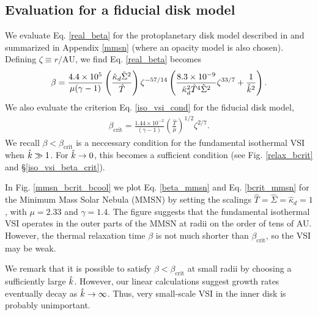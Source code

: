 \subsection{Evaluation for a fiducial disk model}
We evaluate Eq. \ref{real_beta} for the protoplanetary disk model
described in \cite{chiang10} and summarized in Appendix \ref{mmsn}
(where an opacity model is also chosen). Defining $\zeta\equiv
r/\mathrm{AU}$, we find Eq. \ref{real_beta} becomes
\begin{align}\label{beta_mmsn}
\beta =
\frac{4.4\times10^5}{\mu(\gamma-1)}\left(\frac{\hat{\kappa}_d\hat{\Sigma}^2}{\hat{T}}\right)\zeta^{-57/14}\left(\frac{8.3\times10^{-9}}{\hat{\kappa}_d^2\hat{T}^4\hat{\Sigma}^2}\zeta^{33/7}+\frac{1}{\hat{k}^2}\right).    
\end{align}
We also evaluate the criterion Eq. \ref{iso_vsi_cond} for the fiducial
disk model,  
\begin{align}\label{bcrit_mmsn}
  \beta_\mathrm{crit} = \frac{1.44\times10^{-2}}{(\gamma
    -1)}\left(\frac{\hat{T}}{\mu}\right)^{1/2}\zeta^{2/7}. 
\end{align}
We recall $\beta < \beta_\mathrm{crit}$ is a neccessary condition for the
fundamental isothermal VSI when $\hat{k}\gg 1$. For $\hat{k}\to0$, this
becomes a sufficient condition (see Fig. \ref{relax_bcrit} and
\S\ref{iso_vsi_beta_crit}). 

In Fig. \ref{mmsn_bcrit_bcool} we plot Eq. \ref{beta_mmsn} and
Eq. \ref{bcrit_mmsn} for the Minimum Mass Solar Nebula (MMSN) by setting
the scalings $\hat{T}=\hat{\Sigma}=\hat{\kappa}_d=1$, with $\mu =
2.33$ and $\gamma=1.4$. The figure suggests that the fundamental
isothermal VSI operates in the outer parts of the MMSN at radii on
the order of tens of AU. However, the thermal relaxation time $\beta$
is not much shorter than $\beta_\mathrm{crit}$, so the VSI may be 
weak.   

We remark that it is possible to satisfy $\beta<\beta_\mathrm{crit}$
at small radii by choosing a sufficiently large $\hat{k}$. However, our
linear calculations suggest growth rates eventually decay as 
$\hat{k}\to\infty$. Thus, very small-scale VSI in the inner disk is
probably unimportant.   

